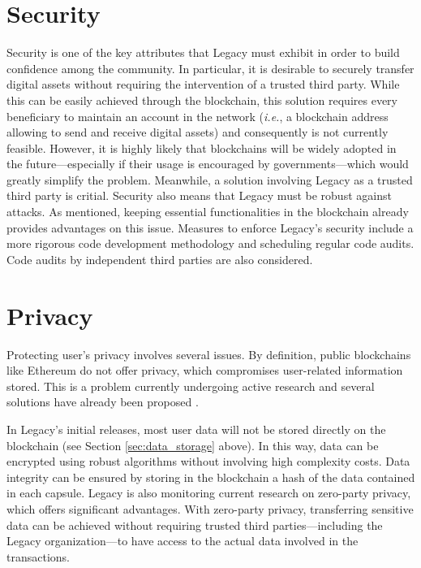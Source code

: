 \section{Security} %
\label{sub:security}
Security is one of the key attributes that Legacy must exhibit in order to build confidence among the community. 
In particular, it is desirable to securely transfer digital assets without requiring the intervention of a trusted third party. 
While this can be easily achieved through the blockchain, this solution requires every beneficiary to maintain an account in the network (\textit{i.e.}, a blockchain address allowing to send and receive digital assets) and consequently is not currently feasible.
However, it is highly likely that blockchains will be widely adopted in the future---especially if their usage is encouraged by governments---which would greatly simplify the problem.
Meanwhile, a solution involving Legacy as a trusted third party is critial.
Security also means that Legacy must be robust against attacks. As mentioned, keeping essential functionalities in the blockchain already provides advantages on this issue. Measures to enforce Legacy's security include a more rigorous code development methodology and scheduling regular code audits. Code audits by independent third parties are also considered.


\section{Privacy} %
\label{sub:privacy}
Protecting user's privacy involves several issues. By definition, public blockchains like Ethereum do not offer privacy, which compromises user-related information stored. This is a problem currently undergoing active research and several solutions have already been proposed \cite{Buterin, keep}. 

In Legacy's initial releases, most user data will not be stored directly on the blockchain (see Section \ref{sec:data_storage} above). In this way, data can be encrypted using robust algorithms without involving high complexity costs. Data integrity can be ensured by storing in the blockchain a hash of the data contained in each capsule.
Legacy is also monitoring current research on zero-party privacy, which offers significant advantages. With zero-party privacy, transferring sensitive data can be achieved without requiring trusted third parties---including the Legacy organization---to have access to the actual data involved in the transactions.

